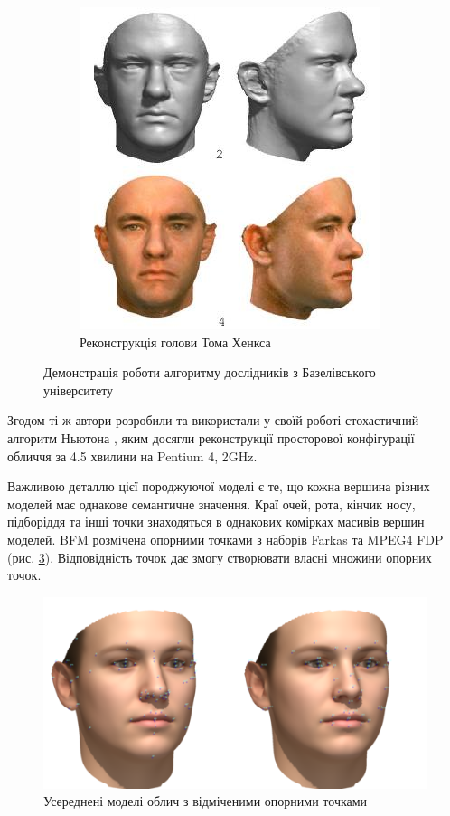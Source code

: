 \begin{figure}[h]
\begin{subfigure}[b]{0.3\textwidth}
    \includegraphics[width=\textwidth]{images/forrest-gump-model}
    \caption{Реконструкція голови Тома Хенкса}
    \label{fig:bfm:tom-hanks}
  \end{subfigure}
  \caption{Демонстрація роботи алгоритму дослідників з Базелівського університету}
\end{figure}

Згодом ті ж автори розробили та використали у своїй роботі
стохастичний алгоритм Ньютона \cite{blanz:vetter:2003},
яким досягли реконструкції просторової конфігурації обличчя за 4.5 хвилини на
Pentium 4, 2GHz.

Важливою деталлю цієї породжуючої моделі є те,
що кожна вершина різних моделей має однакове семантичне значення.
Краї очей, рота, кінчик носу, підборіддя та інші точки
знаходяться в однакових комірках масивів вершин моделей.
BFM розмічена опорними точками з наборів Farkas та MPEG4 FDP
(рис. \ref{fig:problems:feature-points}).
Відповідність точок дає змогу створювати власні множини опорних точок.
\begin{figure}[h]
  \centering
    \includegraphics[width=\textwidth]{images/feature-points}
  \caption{Усереднені моделі облич з відміченими опорними точками}
  \label{fig:problems:feature-points}
\end{figure}

